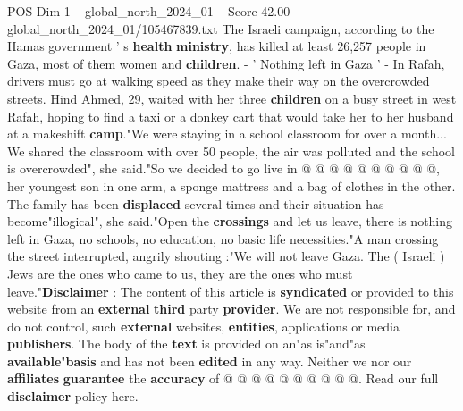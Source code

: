 \begin{textsample}{POS Dim 1 – global\_north\_2024\_01 – Score 42.00 – global\_north\_2024\_01/105467839.txt}
The Israeli campaign, according to the Hamas government ' s \textbf{health} \textbf{ministry}, has killed at least 26,257 people in Gaza, most of them women and \textbf{children}. - ' Nothing left in Gaza ' - In Rafah, drivers must go at walking speed as they make their way on the overcrowded streets.
Hind Ahmed, 29, waited with her three \textbf{children} on a busy street in west Rafah, hoping to find a taxi or a donkey cart that would take her to her husband at a makeshift \textbf{camp}."We were staying in a school classroom for over a month...
We shared the classroom with over 50 people, the air was polluted and the school is overcrowded", she said."So we decided to go live in @ @ @ @ @ @ @ @ @ @, her youngest son in one arm, a sponge mattress and a bag of clothes in the other.
The family has been \textbf{displaced} several times and their situation has become"illogical", she said."Open the \textbf{crossings} and let us leave, there is nothing left in Gaza, no schools, no education, no basic life necessities."A man crossing the street interrupted, angrily shouting :"We will not leave Gaza.
The ( Israeli ) Jews are the ones who came to us, they are the ones who must leave."\textbf{Disclaimer} : The content of this article is \textbf{syndicated} or provided to this website from an \textbf{external} \textbf{third} party \textbf{provider}.
We are not responsible for, and do not control, such \textbf{external} websites, \textbf{entities}, applications or media \textbf{publishers}.
The body of the \textbf{text} is provided on an"as is"and"as \textbf{available}"\textbf{basis} and has not been \textbf{edited} in any way.
Neither we nor our \textbf{affiliates} \textbf{guarantee} the \textbf{accuracy} of @ @ @ @ @ @ @ @ @ @.
Read our full \textbf{disclaimer} policy here.

\end{textsample}
